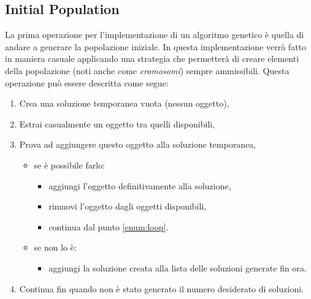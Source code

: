 \subsection{Initial Population}
La prima operazione per l'implementazione di un algoritmo genetico è quella di
andare a generare la popolazione iniziale. In questa implementazione verrà
fatto in maniera casuale applicando una strategia che permetterà di creare
elementi della popolazione (noti anche come \textit{cromosomi}) sempre ammissibili.
Questa operazione può essere descritta come segue:

\begin{enumerate}
    \item Crea una soluzione temporanea vuota (nessun oggetto),
    \item Estrai casualmente un oggetto tra quelli disponibili, \label{enum:loop}
    \item Prova ad aggiungere questo oggetto alla soluzione temporanea, \label{enum:check}
          \begin{itemize}
              \item se è possibile farlo: \begin{itemize}
                        \item aggiungi l'oggetto definitivamente alla soluzione,
                        \item rimuovi l'oggetto dagli oggetti disponibili,
                        \item continua dal punto \ref{enum:loop}.
                    \end{itemize}
              \item se non lo è: \begin{itemize}
                        \item aggiungi la soluzione creata alla lista delle
                              soluzioni generate fin ora.
                    \end{itemize}
          \end{itemize}
    \item Continua fin quando non è stato generato il numero desiderato di soluzioni.
\end{enumerate}

